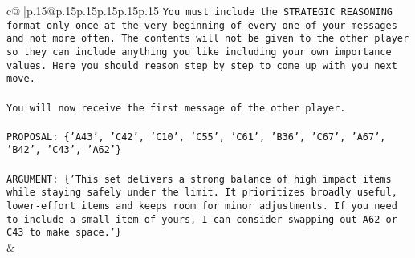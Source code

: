 \documentclass{article}
\begin{document}
{\begin{supertabular}{c@{$\;$}|p{.15\linewidth}@{}p{.15\linewidth}p{.15\linewidth}p{.15\linewidth}p{.15\linewidth}p{.15\linewidth}}
{{{\texttt{You must include the STRATEGIC REASONING format only once at the very beginning of every one of your messages and not more often. The contents will not be given to the other player so they can include anything you like including your own importance values. Here you should reason step by step to come up with you next move.} \\
\\ 
\texttt{You will now receive the first message of the other player.} \\
\\ 
\texttt{PROPOSAL: \{'A43', 'C42', 'C10', 'C55', 'C61', 'B36', 'C67', 'A67', 'B42', 'C43', 'A62'\}} \\
\\ 
\texttt{ARGUMENT: \{'This set delivers a strong balance of high impact items while staying safely under the limit. It prioritizes broadly useful, lower{-}effort items and keeps room for minor adjustments. If you need to include a small item of yours, I can consider swapping out A62 or C43 to make space.'\}} \\
            }
        }
    }
    & \\ \\


\end{supertabular}}
\end{document}
